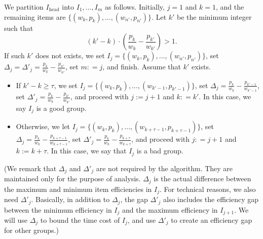 \documentclass[a4paper,UKenglish,cleveref, autoref, thm-restate, pdfa]{lipics-v2021}
\renewcommand{\geq}{\geqslant}
\begin{document}
We partition $I_{\mathrm{head}}$ into $I_1, \ldots, I_m$ as follows. Initially, $j = 1$ and $k = 1$, and the remaining items are $\{(w_k, p_k), \ldots, (w_{n'}, p_{n'})\}$. Let $k'$ be the minimum integer such that
\[
    (k' - k) \cdot (\frac{p_k}{w_k} - \frac{p_{k'}}{w_{k'}}) > 1.
\]
If such $k'$ does not exists, we set $I_j = \{(w_k, p_k), \ldots, (w_{n'}, p_{n'})\}$, set $\Delta_j = \Delta'_j = \frac{p_k}{w_k} - \frac{p_{n'}}{w_{n'}}$, set $m: = j$, and finish. Assume that $k'$ exists. 
\begin{itemize}
    \item If $k' - k \geq \tau$, we set $I_j = \{(w_k, p_k), \ldots, (w_{k' - 1}, p_{k'-1})\}$, set $\Delta_j = \frac{p_k}{w_k} - \frac{p_{k'-1}}{w_{k'-1}}$, set $\Delta'_j = \frac{p_k}{w_k} - \frac{p_{k'}}{w_{k'}}$, and proceed with $j := j + 1$ and $k: = k'$. In this case, we say $I_j$ is a good group. 

    \item Otherwise, we let $I_j = \{(w_k, p_k), \ldots, (w_{k + \tau - 1}, p_{k + \tau - 1})\}$, set $\Delta_j = \frac{p_k}{w_k} - \frac{p_{k + \tau - 1}}{w_{k+\tau - 1}}$, set $\Delta'_j = \frac{p_k}{w_k} - \frac{p_{k + \tau}}{w_{k+\tau}}$, and proceed with $j: = j + 1$ and $k:= k + \tau$. In this case, we say that $I_j$ is a bad group. 
\end{itemize}
(We remark that $\Delta_j$ and $\Delta'_j$ are not required by the algorithm. They are maintained only for the purpose of analysis. $\Delta_j$ is the actual difference between the maximum and minimum item efficiencies in $I_j$. For technical reasons, we also need $\Delta'_j$. Basically, in addition to $\Delta_j$, the gap $\Delta'_j$ also includes the efficiency gap between the minimum efficiency in $I_j$ and the maximum efficiency in $I_{j+1}$. We will use $\Delta_j$ to bound the time cost of $I_j$, and use $\Delta'_j$ to create an efficiency gap for other groups.)
\end{document}
